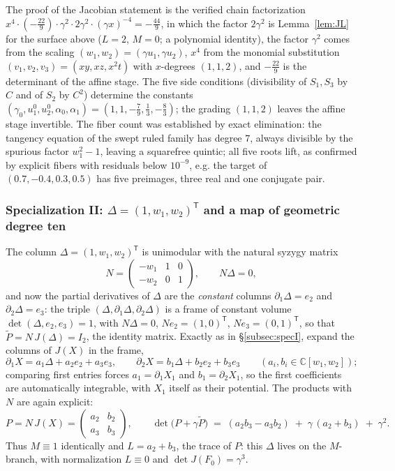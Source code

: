 \documentclass[11pt]{article}
\theoremstyle{plain}
\theoremstyle{definition}
\theoremstyle{remark}
\newcommand{\C}{\mathbb{C}}
\begin{document}
The proof of the Jacobian statement is the verified chain factorization
$x^4\cdot(-\tfrac{22}9)\cdot\gamma^2\cdot2\gamma^2\cdot(\gamma x)^{-4}
=-\tfrac{44}9$, in which the factor $2\gamma^2$ is Lemma~\ref{lem:JL} for the
surface above ($L=2$, $M=0$; a polynomial identity), the factor $\gamma^2$ comes
from the scaling $(w_1,w_2)=(\gamma u_1,\gamma u_2)$, $x^4$ from the monomial
substitution $(v_1,v_2,v_3)=(xy,xz,x^2t)$ with $x$-degrees $(1,1,2)$, and
$-\tfrac{22}9$ is the determinant of the affine stage. The five side conditions
(divisibility of $S_1,S_3$ by $C$ and of $S_2$ by $C^2$) determine the constants
$(\gamma_0,u_1^0,u_2^0,\alpha_0,\alpha_1)=(1,1,-\tfrac79,\tfrac13,-\tfrac83)$;
the grading $(1,1,2)$ leaves the affine stage invertible. The fiber count was
established by exact
elimination: the tangency equation of the swept ruled family has degree $7$,
always divisible by the spurious factor $w_1^2-1$, leaving a squarefree quintic;
all five roots lift, as confirmed by explicit fibers with residuals below
$10^{-9}$, e.g. the target of $(0.7,-0.4,0.3,0.5)$ has five preimages, three real
and one conjugate pair.

\subsubsection{Specialization II: $\Delta=(1,w_1,w_2)^{\mathsf T}$ and a map of geometric degree ten}
\label{subsec:specII}

The column $\Delta=(1,w_1,w_2)^{\mathsf T}$ is unimodular with the natural
syzygy matrix
\[
N=\begin{pmatrix}-w_1&1&0\\ -w_2&0&1\end{pmatrix},
\qquad N\Delta=0 ,
\]
and now the partial derivatives of $\Delta$ are the \emph{constant} columns
$\partial_1\Delta=e_2$ and $\partial_2\Delta=e_3$: the triple
$(\Delta,\partial_1\Delta,\partial_2\Delta)$ is a frame of constant volume
$\det(\Delta,e_2,e_3)=1$, with $N\Delta=0$, $Ne_2=(1,0)^{\mathsf T}$,
$Ne_3=(0,1)^{\mathsf T}$, so that $\widetilde P=N\,J(\Delta)=I_2$, the identity
matrix. Exactly as in \S\ref{subsec:specI}, expand the columns of $J(X)$ in the
frame,
\[
\partial_1X=a_1\Delta+a_2e_2+a_3e_3,\qquad
\partial_2X=b_1\Delta+b_2e_2+b_3e_3
\qquad(a_i,b_i\in\C[w_1,w_2]);
\]
comparing first entries forces $a_1=\partial_1X_1$ and $b_1=\partial_2X_1$, so
the first coefficients are automatically integrable, with $X_1$ itself as their
potential. The products with $N$ are again explicit:
\[
P=N\,J(X)=\begin{pmatrix}a_2 & b_2\\ a_3 & b_3\end{pmatrix},
\qquad
\det\bigl(P+\gamma\widetilde P\bigr)
\;=\;(a_2b_3-a_3b_2)\;+\;\gamma\,(a_2+b_3)\;+\;\gamma^2 .
\]
Thus $M\equiv1$ identically and $L=a_2+b_3$, the trace of $P$: this $\Delta$
lives on the $M$-branch, with normalization $L\equiv0$ and
$\det J(F_0)=\gamma^3$.
\end{document}
